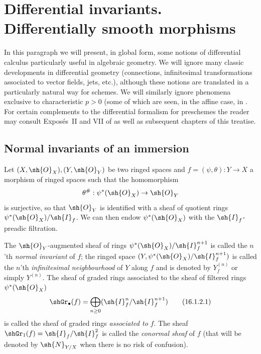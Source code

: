\section{Differential invariants. Differentially smooth morphisms}
\label{section:IV.16}

In this paragraph we will present, in global form, some notions of differential calculus particularly useful in algebraic geometry.
We will ignore many classic developments in differential geometry (connections, infinitesimal transformations associated to vector fields, jets, etc.), although these notions are translated in a particularly natural way for schemes.
We will similarly ignore phenomena exclusive to characteristic $p>0$ (some of which are seen, in the affine case, in .
For certain complements to the differential formalism for preschemes the reader may consult Expos\'es~II and VII of \cite{IV-42} as well as subsequent chapters of this treatise. 

\subsection{Normal invariants of an immersion}
\label{IV.16.1}

\begin{env}[16.1.1]
\label{IV.16.1.1}
Let $(X, \sh{O}_X), (Y, \sh{O}_Y)$ be two ringed spaces and $f = (\psi, \theta): Y \to X$ a morphism of ringed spaces  such that the homomorphism
\[
  \theta^\#: \psi^*(\sh{O}_X) \to \sh{O}_Y
\]
is surjective, so that $\sh{O}_Y$ is identified with a sheaf of quotient rings $\psi^*(\sh{O}_X)/\sh{I}_f$. 
We can then endow $\psi^*(\sh{O}_X)$ with the $\sh{I}_f$-preadic filtration.
\end{env}

\begin{definition}[16.1.2]
\label{IV.16.1.2}
The $\sh{O}_Y$-augmented sheaf of rings $\psi^*(\sh{O}_X)/\sh{I}_f^{n+1}$ is called the $n$'th \emph{normal invariant} of $f$;
the ringed space $(Y, \psi^*(\sh{O}_X)/\sh{I}_f^{n+1})$ is called the $n$'th \emph{infinitesimal neighbourhood} of $Y$ along $f$ and is denoted by $Y^{(n)}_f$ or simply $Y^{(n)}$.
The sheaf of graded rings associated to the sheaf of filtered rings $\psi^*(\sh{O}_X)$
\[
  \label{IV.16.1.2.1}
  \shGr_\bullet(f) = \bigoplus_{n \geq 0}(\sh{I}_f^{n}/\sh{I}_f^{n+1} )
  \tag{16.1.2.1}
\]
is called the sheaf of graded rings \emph{associated to} $f$. The sheaf $\shGr_1(f) = \sh{I}_f/\sh{I}_f^{2}$ is called the \emph{conormal sheaf} of $f$ (that will be denoted by $\sh{N}_{Y/X}$ when there is no risk of confusion). 
\end{definition}

